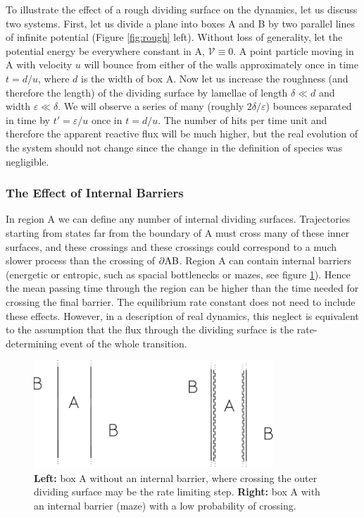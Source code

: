 To illustrate the effect of a rough dividing surface on the dynamics, let us discuss two systems.
First, let us divide a plane into boxes A and B by two parallel lines of infinite potential (Figure \ref{fig:rough} left).
Without loss of generality, let the potential energy be everywhere constant in A, $\mathscr{V} \equiv 0$.
A point particle moving in A with velocity $u$ will bounce from either of the walls approximately once in time $t = d / u$, where $d$ is the width of box A.
Now let us increase the roughness (and therefore the length) of the dividing surface by lamellae of length $\delta \ll d$ and width $\varepsilon \ll \delta$.
We will observe a series of many (roughly $2 \delta / \varepsilon$) bounces separated in time by $t' = \varepsilon / u$ once in $t = d / u$.
The number of hits per time unit and therefore the apparent reactive flux will be much higher, but the real evolution of the system should not change since the change in the definition of species was negligible.

\subsubsection*{The Effect of Internal Barriers}

In region A we can define any number of internal dividing surfaces.
Trajectories starting from states far from the boundary of A must cross many of these inner surfaces, and these crossings and these crossings could correspond to a much slower process than the crossing of $\partial \rm AB$.
Region A can contain internal barriers (energetic or entropic, such as spacial bottlenecks or mazes, see figure \ref{fig:maze}).
Hence the mean passing time through the region can be higher than the time needed for crossing the final barrier.
The equilibrium rate constant does not need to include these effects.
However, in a description of real dynamics, this neglect is equivalent to the assumption that the flux through the dividing surface is the rate-determining event of the whole transition.

\begin{figure}[htb]
\centering
\includegraphics[width=9cm]{Images/diag1-2.pdf}
\caption[Comparison of systems with and without internal barriers.]{\textbf{Left:} box A without an internal barrier, where crossing the outer dividing surface may be the rate limiting step. \textbf{Right:}  box A with an internal barrier (maze) with a low probability of crossing.}
\label{fig:maze}
\end{figure}



